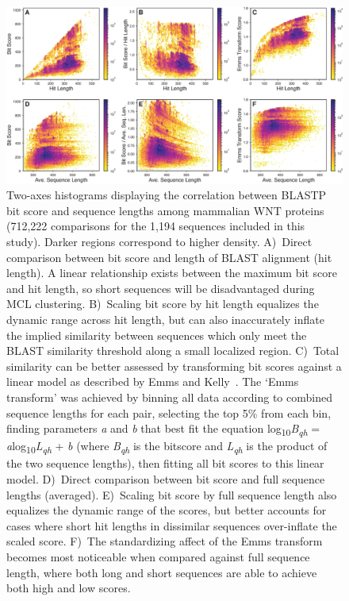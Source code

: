 \documentclass[twocolumn]{bmcart}  %
\begin{document}
\begin{figure}[t]
  \begin{center}
  \includegraphics[height=0.34\textheight]{../figures/Bitscore_transforms.eps}
\end{center}
\caption{Two-axes histograms displaying the correlation between BLASTP bit score and sequence lengths among mammalian WNT proteins (712,222 comparisons for the 1,194 sequences included in this study).
Darker regions correspond to higher density.
A)~Direct comparison between bit score and length of BLAST alignment (hit length).
A linear relationship exists between the maximum bit score and hit length, so short sequences will be disadvantaged during MCL clustering.
B)~Scaling bit score by hit length equalizes the dynamic range across hit length, but can also inaccurately inflate the implied similarity between sequences which only meet the BLAST similarity threshold along a small localized region.
C)~Total similarity can be better assessed by transforming bit scores against a linear model as described by Emms and Kelly~\cite{Emms:2015ig}. The `Emms transform' was achieved by binning all data according to combined sequence lengths for each pair, selecting the top 5\% from each bin, finding parameters \textit{a} and \textit{b} that best fit the equation log\textsubscript{10}\textit{B\textsubscript{qh}} = \textit{a}log\textsubscript{10}\textit{L\textsubscript{qh}} + \textit{b} (where \textit{B\textsubscript{qh}} is the bitscore and \textit{L\textsubscript{qh}} is the product of the two sequence lengths), then fitting all bit scores to this linear model.
D)~Direct comparison between bit score and full sequence lengths (averaged).
E)~Scaling bit score by full sequence length also equalizes the dynamic range of the scores, but better accounts for cases where short hit lengths in dissimilar sequences over-inflate the scaled score.
F)~The standardizing affect of the Emms transform becomes most noticeable when compared against full sequence length, where both long and short sequences are able to achieve both high and low scores.
}
\label{fig:Bitscores}
\end{figure}
\end{document}
